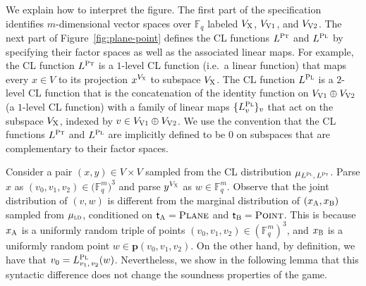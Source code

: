 \documentclass[11pt]{article}
\newtheorem{lemma}[theorem]{Lemma}
\theoremstyle{definition}
\newcommand{\F}{\ensuremath{\mathbb{F}}}
\newcommand{\ld}{\textsc{ld}}
\newcommand{\pt}{\textrm{pt}}
\newcommand{\pl}{\mathbf{p}}
\newcommand{\labelstyle}[1]{\ensuremath{\textsc{#1}}\xspace}
\newcommand{\xpt}{\labelstyle{X}}
\newcommand{\dir}[1]{\labelstyle{V#1}}
\newcommand{\plf}{\labelstyle{Pl}}
\newcommand{\ptf}{\labelstyle{Pt}}
\newcommand{\tvarstyle}[1]{\mathsf{#1}}
\newcommand{\tvar}{\ensuremath{\tvarstyle{t}}}
\newcommand{\alice}{\labelstyle{A}}
\newcommand{\bob}{\labelstyle{B}}
\newcommand{\typestyle}[1]{\ensuremath{\textsc{#1}}\xspace}
\newcommand{\Plane}{\typestyle{Plane}}
\newcommand{\Point}{\typestyle{Point}}
\newcommand{\hnote}[1]{}
\begin{document}
We explain how to interpret the figure.
The first part of the specification identifies $m$-dimensional vector spaces
over $\F_q$ labeled $V_\xpt$, $V_{\dir{1}}$, and $V_{\dir{2}}$.
The next part of Figure~\ref{fig:plane-point} defines the CL functions $L^\ptf$
and $L^\plf$ by specifying their factor spaces as well as the associated linear
maps.
For example, the CL function $L^\ptf$ is a $1$-level CL function (i.e.\ a linear
function) that maps every $x \in V$ to its projection $x^{V_\xpt}$ to subspace
$V_\xpt$.
The CL function $L^\plf$ is a $2$-level CL function that is the concatenation of
the identity function on $V_{\dir{1}} \oplus V_{\dir{2}}$ (a $1$-level CL
function) with a family of linear maps $\{L_v^\plf\}_v$ that act on the subspace
$V_\xpt$, indexed by $v \in V_{\dir{1}} \oplus V_{\dir{2}}$.
We use the convention that the CL functions $L^\ptf$ and $L^\plf$ are implicitly
defined to be $0$ on subspaces that are complementary to their factor spaces.

%

Consider a pair $(x,y) \in V \times V$ sampled from the CL distribution
$\mu_{L^\plf,\, L^\ptf}$.
Parse $x$ as $(v_0, v_1, v_2) \in \bigl( \F_q^m \bigr)^3$ and parse $y^{V_\xpt}$
as $w \in \F_q^m$.
Observe that the joint distribution of $(v, w)$ is different from the marginal
distribution of $(x_\alice,x_\bob)$ sampled from $\mu_\ld$, conditioned on
$\tvar_\alice = \Plane$ and $\tvar_\bob = \Point$.
This is because $x_\alice$ is a uniformly random triple of points $(v_0,v_1,v_2)
\in (\F_q^m)^3$, and $x_\bob$ is a uniformly random point $w \in
\pl(v_0,v_1,v_2)$.
On the other hand, by definition, we have that $v_0 = L^\plf_{v_1,\, v_2}(w)$.
Nevertheless, we show in the following lemma that this syntactic difference does
not change the soundness properties of the game.
\end{document}
